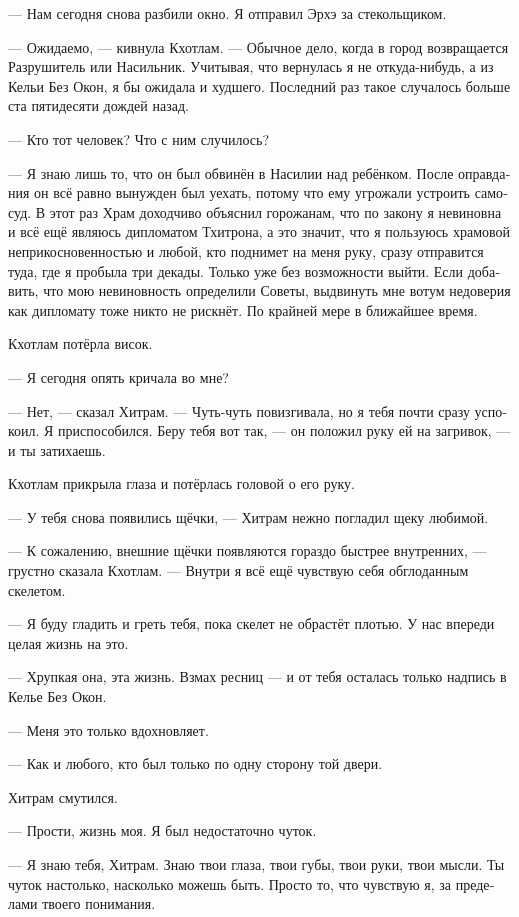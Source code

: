 \documentclass[a4paper,12pt,fleqn]{book}\usepackage{cooltooltips}\usepackage{polyglossia}\setdefaultlanguage[babelshorthands=true]{russian}\setotherlanguage{english}\defaultfontfeatures{Ligatures=TeX,Mapping=tex-text} \usepackage{xcolor}\definecolor{lightgray}{HTML}{bbbbbb}\color{lightgray}\newcommand{\ml}[3]{\textenglish{\textcolor{black}{#3}} }
\begin{document}
--- Нам сегодня снова разбили окно.
Я отправил Эрхэ за стекольщиком.

--- Ожидаемо, --- кивнула Кхотлам.
--- Обычное дело, когда в город возвращается Разрушитель или Насильник.
Учитывая, что вернулась я не откуда-нибудь, а из Кельи Без Окон, я бы ожидала и худшего.
Последний раз такое случалось больше ста пятидесяти дождей назад.

--- Кто тот человек?
Что с ним случилось?

--- Я знаю лишь то, что он был обвинён в Насилии над ребёнком.
После оправдания он всё равно вынужден был уехать, потому что ему угрожали устроить самосуд.
В этот раз Храм доходчиво объяснил горожанам, что по закону я невиновна и всё ещё являюсь дипломатом Тхитрона, а это значит, что я пользуюсь храмовой неприкосновенностью и любой, кто поднимет на меня руку, сразу отправится туда, где я пробыла три декады.
Только уже без возможности выйти.
Если добавить, что мою невиновность определили Советы, выдвинуть мне вотум недоверия как дипломату тоже никто не рискнёт.
По крайней мере в ближайшее время.

Кхотлам потёрла висок.

--- Я сегодня опять кричала во мне?

--- Нет, --- сказал Хитрам.
--- Чуть-чуть повизгивала, но я тебя почти сразу успокоил.
Я приспособился.
Беру тебя вот так, --- он положил руку ей на загривок, --- и ты затихаешь.

Кхотлам прикрыла глаза и потёрлась головой о его руку.

--- У тебя снова появились щёчки, --- Хитрам нежно погладил щеку любимой.

--- К сожалению, внешние щёчки появляются гораздо быстрее внутренних, --- грустно сказала Кхотлам.
--- Внутри я всё ещё чувствую себя обглоданным скелетом.

--- Я буду гладить и греть тебя, пока скелет не обрастёт плотью.
У нас впереди целая жизнь на это.

--- Хрупкая она, эта жизнь.
Взмах ресниц --- и от тебя осталась только надпись в Келье Без Окон.

--- Меня это только вдохновляет.

--- Как и любого, кто был только по одну сторону той двери.

Хитрам смутился.

--- Прости, жизнь моя.
Я был недостаточно чуток.

--- Я знаю тебя, Хитрам.
Знаю твои глаза, твои губы, твои руки, твои мысли.
Ты чуток настолько, насколько можешь быть.
Просто то, что чувствую я, за пределами твоего понимания.
\end{document}
